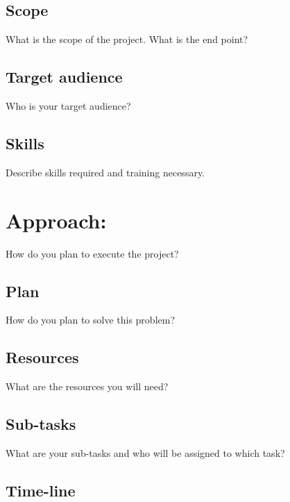 \documentclass[10pt,twocolumn,letterpaper]{article}
\begin{document}
            \subsection{Scope}
            
            What is the scope of the project. What is the end point?
            
            \subsection{Target audience}
            
            Who is your target audience?
            
            \subsection{Skills}
            
            Describe skills required and training necessary.
        
	   	\section{Approach:}
        
        How do you plan to execute the project?
        
            \subsection{Plan}
            
            How do you plan to solve this problem?
            
            \subsection{Resources}
            
            What are the resources you will need?
            
            \subsection{Sub-tasks}
            
            What are your sub-tasks and who will be assigned to which task?
            
            \subsection{Time-line}
            
\end{document}
